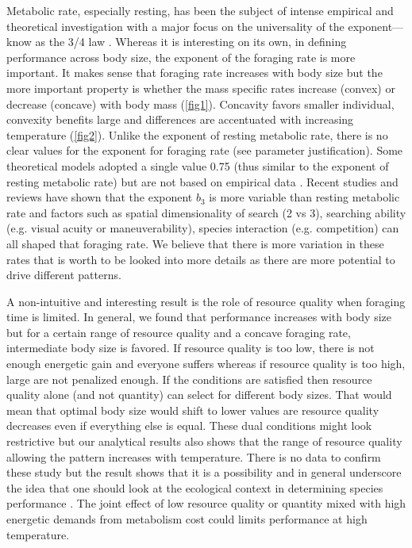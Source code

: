 Metabolic rate, especially resting, has been the subject of intense empirical and theoretical investigation with a major focus on  the universality of the exponent---know as the 3/4 law \citep{Peters1986,West1997, Kozlowski1997, Brown2004, Isaac2010}. 
Whereas it is interesting on its own, in defining performance across body size, the exponent of the foraging rate is more important.
It makes sense that foraging rate increases with body size but the more important property is whether the mass specific rates increase (convex) or decrease (concave) with body mass (\cref{fig1}).
Concavity favors smaller individual, convexity benefits large and differences are accentuated with increasing temperature (\cref{fig2}).
Unlike the exponent of resting metabolic rate, there is no clear values for the exponent for foraging rate (see parameter justification).
Some theoretical models adopted a single value 0.75 (thus similar to the exponent of resting metabolic rate) but are not based on empirical data \citep{Yodzis1992, Brown1993}.
Recent studies and reviews have shown that the exponent $b_3$  is more variable than resting metabolic rate and factors such as spatial dimensionality of search (2 vs 3), searching ability (e.g. visual acuity or maneuverability),  species interaction (e.g. competition) can all shaped that foraging rate\citep{Pawar2012, Kalinkat2015}.
We believe that there is more variation in these rates that is worth to be looked into more details as there are more potential to drive different patterns.

A non-intuitive and interesting result is the role of resource quality when foraging time is limited.
In general, we found that performance increases with body size but for a certain range of resource quality and a concave foraging rate,  intermediate body size is favored.
If resource quality is too low, there is not enough energetic gain and everyone suffers whereas if resource quality is too high, large are not penalized enough.
If the conditions are satisfied then resource quality alone (and not quantity) can select for different body sizes.
That would mean that optimal body size would shift to lower values are resource quality decreases even if  everything else is equal.
These dual conditions might look restrictive but our analytical results also shows that the range of resource quality allowing the pattern increases with temperature. 
There is no data to confirm these study but the result shows that it is a possibility and in general  underscore the idea that one should look at the ecological context in determining species performance \citep{Sears2015}.
The joint effect of low resource quality or quantity mixed with high energetic demands from  metabolism cost could  limits performance at high temperature.


